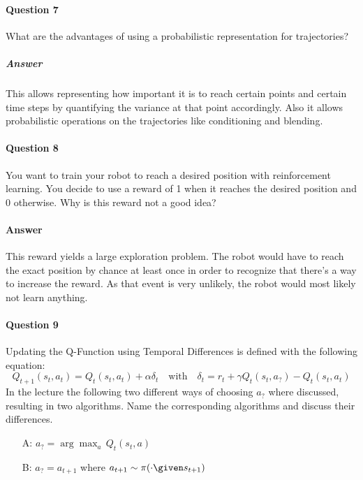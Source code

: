 	\paragraph{Question 7}
		What are the advantages of using a probabilistic representation for trajectories?

		\subparagraph{Answer}
			This allows representing how important it is to reach certain points and certain time steps by quantifying the variance at that point accordingly. Also it allows probabilistic operations on the trajectories like conditioning and blending.

	\paragraph{Question 8}
		You want to train your robot to reach a desired position with reinforcement learning. You decide to use a reward of \num{1} when it reaches the desired position and \num{0} otherwise. Why is this reward not a good idea?

	\paragraph{Answer}
		This reward yields a large exploration problem. The robot would have to reach the exact position by chance at least once in order to recognize that there's a way to increase the reward. As that event is very unlikely, the robot would most likely not learn anything.

	\paragraph{Question 9}
		Updating the Q-Function using Temporal Differences is defined with the following equation:
		\begin{equation*}
			Q_{t + 1}(s_t, a_t) = Q_t(s_t, a_t) + \alpha \delta_t
			\quad\text{with}\quad
			\delta_t = r_t + \gamma Q_t(s_t, a_?) - Q_t(s_t, a_t)
		\end{equation*}
		In the lecture the following two different ways of choosing \(a_?\) where discussed, resulting in two algorithms. Name the corresponding algorithms and discuss their differences.
		\begin{itemize}
			\item[A:] \( a_? = \arg\max_a\, Q_t(s_t, a) \)
			\item[B:] \( a_? = a_{t + 1} \) where \( a_{t + 1} \sim \pi(\cdot \given s_{t + 1}) \)
		\end{itemize}

